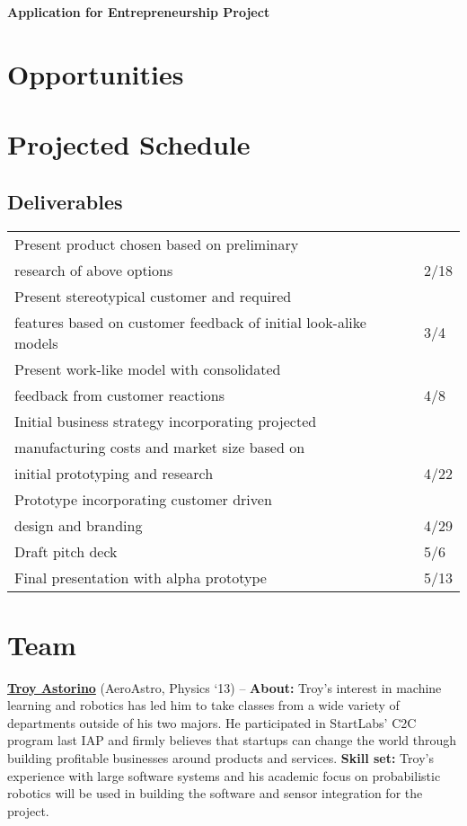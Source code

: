 \documentclass[10pt]{article}
\begin{document}
\begin{center}
\LARGE{\textbf{Application for Entrepreneurship Project}}
\end{center}

\section*{Opportunities}

\section*{Projected Schedule}

\subsection*{Deliverables}
\begin{tabular}{l|l}
Present product chosen based on preliminary \\ research of above options & 2/18 \\
Present stereotypical customer and required \\ features based on customer feedback of initial look-alike models & 3/4 \\
Present work-like model with consolidated \\ feedback from customer reactions & 4/8 \\
Initial business strategy incorporating projected \\ manufacturing costs and market
size based on \\ initial prototyping and research & 4/22 \\
Prototype incorporating customer driven \\ design and branding & 4/29 \\
Draft pitch deck & 5/6 \\
Final presentation with alpha prototype & 5/13 \\
\end{tabular}


\section*{Team}
\textbf{\href{http://www.troyastorino.com}{Troy Astorino}} (AeroAstro, Physics `13) -- \textbf{About:} Troy's interest in machine learning and robotics has led him to take classes from a wide variety of departments outside of his two majors. He participated in StartLabs' C2C program last IAP and firmly believes that startups can change the world through building profitable businesses around products and services. \textbf{Skill set:} Troy's experience with large software systems and his academic focus on probabilistic robotics will be used in building the software and sensor integration for the project. 
\end{document}

